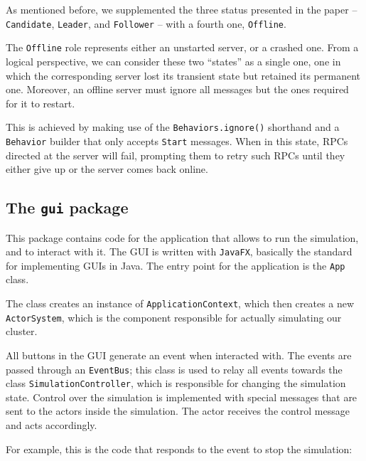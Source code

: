 As mentioned before, we supplemented the three status presented in the paper -- \texttt{Candidate}, \texttt{Leader}, and \texttt{Follower} -- with a fourth one, \texttt{Offline}.

The \texttt{Offline} role represents either an unstarted server, or a crashed one. From a logical perspective, we can consider these two ``states'' as a single one, one in which the corresponding server lost its transient state but retained its permanent one. Moreover, an offline server must ignore all messages but the ones required for it to restart.


This is achieved by making use of the \texttt{Behaviors.ignore()} shorthand and a \texttt{Behavior} builder that only accepts \texttt{Start} messages. When in this state, RPCs directed at the server will fail, prompting them to retry such RPCs until they either give up or the server comes back online.

\subsection{The \texttt{gui} package}
This package contains code for the application that allows to run the simulation, and to interact with it. The GUI is written with \texttt{JavaFX}, basically the standard for implementing GUIs in Java. The entry point for the application is the \texttt{App} class.


The class creates an instance of \texttt{ApplicationContext}, which then creates a new \texttt{ActorSystem}, which is the component responsible for actually simulating our cluster.


All buttons in the GUI generate an event when interacted with. The events are passed through an \texttt{EventBus}; this class is used to relay all events towards the class \texttt{SimulationController}, which is responsible for changing the simulation state. Control over the simulation is implemented with special messages that are sent to the actors inside the simulation. The actor receives the control message and acts accordingly.

For example, this is the code that responds to the event to stop the simulation: 


